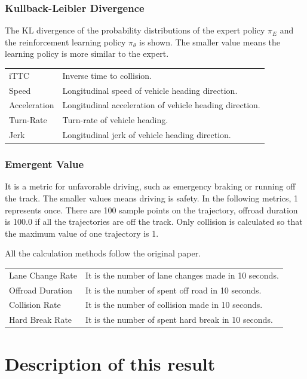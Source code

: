 \subsubsection{Kullback-Leibler Divergence}

The KL divergence of the probability distributions of the expert policy $\pi_E$ and the reinforcement learning policy $\pi_\theta$ is shown. The smaller  value means the learning policy is more similar to the expert.

\begin{tabular}{ll}
iTTC  & Inverse time to collision. \\
Speed & Longitudinal speed of vehicle heading direction. \\
Acceleration & Longitudinal acceleration of vehicle heading direction. \\
Turn-Rate & Turn-rate of vehicle heading. \\
Jerk & Longitudinal jerk of vehicle heading direction. \\
\end{tabular}


\subsubsection{Emergent Value}

It is a metric for unfavorable driving, such as emergency braking or running off the track. The smaller values means driving is safety.
In the following metrics, 1 represents once.
There are 100 sample points on the trajectory, 
offroad duration is 100.0 if all the trajectories are off the track.
Only collision is calculated so that the maximum value of one trajectory is 1.

All the calculation methods follow the original paper.\cite{DBLP:journals/corr/KueflerMWK17}


\begin{tabular}{ll}
Lane Change Rate & It is the number of lane changes made in 10 seconds. \\
Offroad Duration & It is the number of spent off road in 10 seconds. \\
Collision Rate   & It is the number of collision made in 10 seconds. \\
Hard Break Rate  & It is the number of spent hard break in 10 seconds. \\
\end{tabular}


\section{Description of this result}

